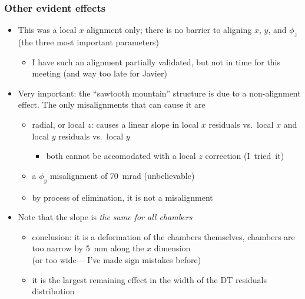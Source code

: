\documentclass[compress]{beamer}
\begin{document}
\begin{frame}
\frametitle{Other evident effects}
\begin{itemize}
\item This was a local $x$ alignment only; there is no barrier to
  aligning $x$, $y$, and $\phi_z$ (the three most important
  parameters)
\begin{itemize}
\item I have such an alignment partially validated, but not in time for this meeting (and way too late for Javier)
\end{itemize}

\item Very important: the ``sawtooth mountain'' structure is due to a non-alignment effect.  The only misalignments that can cause it are
\begin{itemize}
\item radial, or local $z$: causes a linear slope in local $x$ residuals vs.\ local $x$ and local $y$ residuals vs.\ local $y$
\begin{itemize}
\item both cannot be accomodated with a local $z$ correction \mbox{(I tried it)\hspace{-1 cm}}
\end{itemize}
\item a $\phi_y$ misalignment of 70~mrad (unbelievable)
\item by process of elimination, it is not a misalignment
\end{itemize}

\item Note that the slope is {\it the same for all chambers}
\begin{itemize}
\item conclusion: it is a deformation of the chambers themselves, chambers are too narrow by 5~mm along the $x$ dimension \\
(or too wide--- I've made sign mistakes before)

\item it is the largest remaining effect in the width of the DT residuals distribution
\end{itemize}
\end{itemize}
\label{numpages}
\end{frame}


\end{document}
